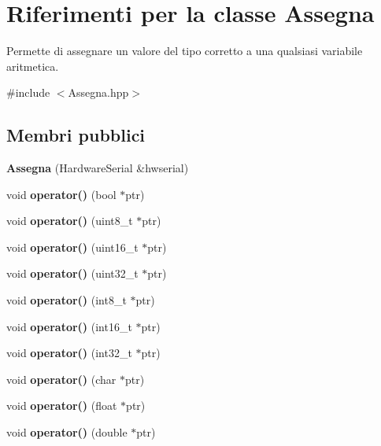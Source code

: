 \section{Riferimenti per la classe Assegna}
\label{class_assegna}


Permette di assegnare un valore del tipo corretto a una qualsiasi variabile aritmetica.  




{\ttfamily \#include $<$Assegna.\+hpp$>$}

\subsection*{Membri pubblici}
\begin{DoxyCompactItemize}
\item 
\mbox{\label{class_assegna_a66e1384a62510098ae980d2459dcc515}} 
{\bfseries Assegna} (Hardware\+Serial \&hwserial)
\item 
\mbox{\label{class_assegna_af73ceecd7402d5f580d834a50da4ba02}} 
void {\bfseries operator()} (bool $\ast$ptr)
\item 
\mbox{\label{class_assegna_af2c057941eb9e36451cfbadd2870bf1e}} 
void {\bfseries operator()} (uint8\+\_\+t $\ast$ptr)
\item 
\mbox{\label{class_assegna_a617f396b9c6e0b57daf0c2260ec7045b}} 
void {\bfseries operator()} (uint16\+\_\+t $\ast$ptr)
\item 
\mbox{\label{class_assegna_aedc0e576f19a465cadf87923df1a815d}} 
void {\bfseries operator()} (uint32\+\_\+t $\ast$ptr)
\item 
\mbox{\label{class_assegna_abcf5180cd65bf7f837c0ad2f93240807}} 
void {\bfseries operator()} (int8\+\_\+t $\ast$ptr)
\item 
\mbox{\label{class_assegna_a0bb43f452e3de3e3600c108d3ac24dd2}} 
void {\bfseries operator()} (int16\+\_\+t $\ast$ptr)
\item 
\mbox{\label{class_assegna_acdac6628bc61b368ebc3498f7f841772}} 
void {\bfseries operator()} (int32\+\_\+t $\ast$ptr)
\item 
\mbox{\label{class_assegna_a5851ae575490d2589ee5cd3c8ec09d6f}} 
void {\bfseries operator()} (char $\ast$ptr)
\item 
\mbox{\label{class_assegna_a6d50cfe9292d81efef4da9ba8a8278e0}} 
void {\bfseries operator()} (float $\ast$ptr)
\item 
\mbox{\label{class_assegna_a7636492e8c3fd23508f6a47b7e8a75ad}} 
void {\bfseries operator()} (double $\ast$ptr)
\end{DoxyCompactItemize}


